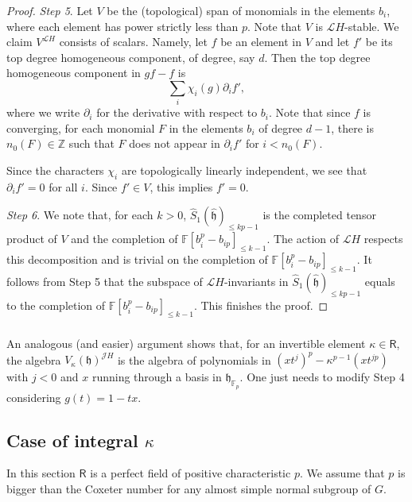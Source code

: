 \documentclass{amsart}
\theoremstyle{definition}
\newcommand{\sss}{\subsubsection{}}
\newcommand{\Ring}{\mathsf{R}}
\newcommand{\hg}{\hat{\mathfrak{g}}}
\newcommand{\h}{\mathfrak{h}}
\newcommand{\hh}{\hat{\mathfrak{h}}}
\newcommand{\F}{\mathbb{F}}
\newcommand{\Z}{\mathbb{Z}}
\newcommand{\Jet}{\mathscr{J}}
\newcommand{\Loop}{\mathscr{L}}
\numberwithin{equation}{section}
\begin{document}
\begin{proof}


{\it Step 5}. Let $V$ be the (topological) span of monomials in the elements $b_i$, where each element has power strictly less than $p$. Note that $V$ is $\Loop H$-stable. We claim $V^{\Loop H}$ consists of scalars. Namely, let $f$ be an element in $V$ and let $f'$ be its top degree homogeneous component, of degree, say $d$. Then the top degree homogeneous component in 
$gf-f$ is 
\begin{equation}\label{eq:action_difference}
\sum_i \chi_i(g)\partial_i  f',
\end{equation}
where we write $\partial_i$ for the derivative with respect to $b_i$. Note that since $f$ is converging, for each monomial $F$ in the elements $b_i$ of degree $d-1$, there is $n_0(F)\in \Z$ such that $F$ does not appear in $\partial_i f'$ for $i<n_0(F)$.

Since the characters $\chi_i$ are topologically linearly independent, we see that $\partial_i f'=0$ for all $i$. Since
$f'\in V$, this implies $f'=0$.

{\it Step 6}. We note that, for each $k>0$, $\widehat{S}_1(\hh)_{\leqslant kp-1}$ is the completed tensor product of $V$ and the completion of $\F[b_i^p-b_{ip}]_{\leqslant k-1}$. The action of $\Loop H$ respects this decomposition and is trivial on the completion of 
$\F[b_i^p-b_{ip}]_{\leqslant k-1}$. It follows from Step 5
that the subspace of $\Loop H$-invariants in $\widehat{S}_1(\hh)_{\leqslant kp-1}$ equals to the completion of $\F[b_i^p-b_{ip}]_{\leqslant k-1}$. This finishes the proof.
\end{proof}

\sss\label{SSS_vertex_abelian} An analogous (and easier) argument shows that, for an invertible element $\kappa\in \Ring$, the algebra $V_\kappa(\h)^{\Jet H}$ is the algebra of polynomials in $(xt^j)^p-\kappa^{p-1}(x t^{jp})$ with $j<0$
and $x$ running through a basis in $\h_{\F_p}$. One just needs to modify Step 4 considering $g(t)=1-tx$.

\subsection{Case of integral $\kappa$}
In this section $\Ring$ is a perfect field of positive characteristic $p$. We assume that $p$ is bigger than the Coxeter number for any almost simple normal subgroup of $G$.
\end{document}

